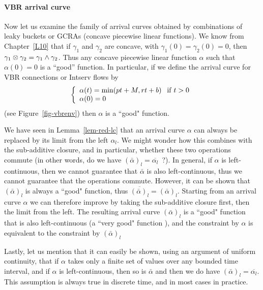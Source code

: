 \paragraph{VBR arrival curve}
Now let us examine the family of arrival curves obtained by
combinations of leaky buckets or GCRAs (concave piecewise linear
functions). We know from Chapter~\ref{L10} that if $\gamma_{1}$
and $\gamma_{2}$ are concave, with
$\gamma_{1}(0)=\gamma_{2}(0)=0$, then $\gamma_{1} \otimes \gamma_{2}
= \gamma_{1} \wedge \gamma_{2}$. Thus any concave piecewise linear
function $\alpha$ such that $\alpha(0)=0$ is a ``good'' function.
In particular, if we define the arrival curve for VBR connections
or Intserv flows by
$$
\left\{\begin{array}{l} 
\alpha(t) = \min (pt + M, rt +b) \,\,\, \mathrm{\; if \; } t >0\\
 \alpha(0) = 0
 \end{array} \right. $$ (see Figure~\ref{fig-vbrenv}) then $\alpha$ is a ``good"
function.

We have seen in Lemma~\ref{lem-red-lc} that an arrival curve
$\alpha$ can always be replaced by its limit from the left
$\alpha_l$. We might wonder how this combines with the
sub-additive closure, and in particular, whether these two
operations commute (in other words, do we have $(\bar{\alpha})_l =
\overline{\alpha _l}$~?). In general, if $\alpha$ is
left-continuous, then we cannot guarantee that $\bar{\alpha}$ is
also left-continuous, thus we cannot guarantee that the operations
commute. However, it can be shown that $(\bar{\alpha})_l$ is
always a ``good" function, thus
$\overline{(\bar{\alpha})_l}=(\bar{\alpha})_l$. Starting from an
arrival curve $\alpha$ we can therefore improve by taking the
sub-additive closure first, then the limit from the left. The
resulting arrival curve $(\bar{\alpha})_l$ is a ``good" function
that is also left-continuous (a ``very good" function%
), and the constraint by $\alpha$ is
equivalent to the constraint by $(\bar{\alpha})_l$

Lastly, let us mention that it can easily be shown, using an
argument of uniform continuity, that if $\alpha$ takes only a
finite set of values over any bounded time interval, and if
$\alpha$ is left-continuous, then so is $\bar{\alpha}$ and then we
do have $(\bar{\alpha})_l = \overline{\alpha _l}$. This assumption
is always true in discrete time, and in most cases in practice.

